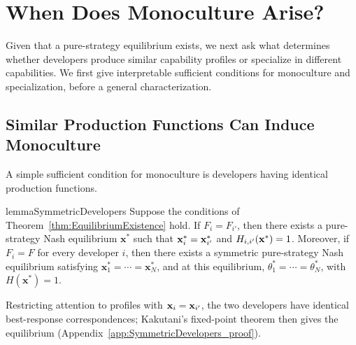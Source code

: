 \section{When Does Monoculture Arise?}
\label{sec:monoculture}
Given that a pure-strategy equilibrium exists, we next ask what determines whether developers produce similar capability profiles or specialize in different capabilities. 
We first give interpretable sufficient conditions for monoculture and specialization, before a general characterization.

\subsection{Similar Production Functions Can Induce Monoculture}
A simple sufficient condition for monoculture is developers having identical production functions. 

\begin{restatable}{lemma}{SymmetricDevelopers}
\label{lem:SymmetricDevelopers}
Suppose the conditions of Theorem~\ref{thm:EquilibriumExistence} hold. 
If $F_i=F_{i'}$, then there exists a pure-strategy Nash equilibrium $\mathbf{x}^*$ such that $\mathbf{x}_i^*=\mathbf{x}_{i'}^*$ and $H_{i,i'}(\mathbf{x}^*) = 1$. 
Moreover, if $F_i=F$ for every developer $i$, then there exists a symmetric pure-strategy Nash equilibrium satisfying  $\mathbf{x}_1^*=\cdots=\mathbf{x}_N^*$, and at this equilibrium, $\theta_1^*=\cdots=\theta_N^*$, with $H(\mathbf{x}^*)=1$. 
\end{restatable}
Restricting attention to profiles with $\mathbf{x}_i=\mathbf{x}_{i'}$, the two developers have identical best-response correspondences; Kakutani's fixed-point theorem then gives the equilibrium (Appendix~\ref{app:SymmetricDevelopers_proof}).

